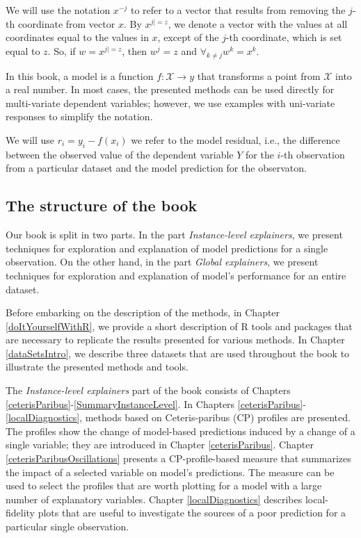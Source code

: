 \documentclass[12pt,]{krantz}
\theoremstyle{definition}
\theoremstyle{definition}
\theoremstyle{definition}
\theoremstyle{remark}
\begin{document}
We will use the notation \(x^{-j}\) to refer to a vector that results
from removing the \(j\)-th coordinate from vector \(x\). By
\(x^{j|=z}\), we denote a vector with the values at all coordinates
equal to the values in \(x\), except of the \(j\)-th coordinate, which
is set equal to \(z\). So, if \(w=x^{j|=z}\), then \(w^j = z\) and
\(\forall_{k\neq j} w^k = x^k\).

In this book, a model is a function \(f:\mathcal X \rightarrow y\) that
transforms a point from \(\mathcal X\) into a real number. In most
cases, the presented methods can be used directly for multi-variate
dependent variables; however, we use examples with uni-variate responses
to simplify the notation.

We will use \(r_i = y_i - f(x_i)\) we refer to the model residual, i.e.,
the difference between the observed value of the dependent variable
\(Y\) for the \(i\)-th observation from a particular dataset and the
model prediction for the observaton.

\hypertarget{bookstructure}{%
\subsection{The structure of the book}\label{bookstructure}}

Our book is split in two parts. In the part \emph{Instance-level
explainers}, we present techniques for exploration and explanation of
model predictions for a single observation. On the other hand, in the
part \emph{Global explainers}, we present techniques for exploration and
explanation of model's performance for an entire dataset.

Before embarking on the description of the methods, in Chapter
\ref{doItYourselfWithR}, we provide a short description of R tools and
packages that are necessary to replicate the results presented for
various methods. In Chapter \ref{dataSetsIntro}, we describe three
datasets that are used throughout the book to illustrate the presented
methods and tools.

The \emph{Instance-level explainers} part of the book consists of
Chapters \ref{ceterisParibus}-\ref{SummaryInstanceLevel}. In Chapters
\ref{ceterisParibus}-\ref{localDiagnostics}, methods based on
Ceteris-paribus (CP) profiles are presented. The profiles show the
change of model-based predictions induced by a change of a single
variable; they are introduced in Chapter \ref{ceterisParibus}. Chapter
\ref{ceterisParibusOscillations} presents a CP-profile-based measure
that summarizes the impact of a selected variable on model's
predictions. The measure can be used to select the profiles that are
worth plotting for a model with a large number of explanatory variables.
Chapter \ref{localDiagnostics} describes local-fidelity plots that are
useful to investigate the sources of a poor prediction for a particular
single observation.
\end{document}
